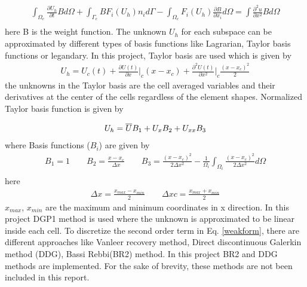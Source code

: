 \documentclass[12pt]{elsarticle}
\begin{document}
\begin{equation}\label{weakform}
\begin{gathered}
\int_{\Omega_e} \frac{\partial U_h}{\partial t} B d\Omega + \int_{\Gamma_e} B F_i(U_h) n_i d\Gamma - \int_{\Omega_e} F_i (U_h)\frac{\partial B}{\partial x_i}  d\Omega=\int \frac{\partial^2 u}{\partial x^2}B d \Omega\\
\end{gathered}
\end{equation}
here B is the weight function. The unknown $U_h$ for each subspace can be approximated by different types of basis functions like Lagrarian, Taylor basis functions or legandary. In this project, Taylor basis are used which is given by
\begin{equation}
\begin{gathered}
U_h=U_c(t)+\frac{\partial U(t)}{\partial x}\Big|_c (x-x_c)+\frac{\partial^2 U(t)}{\partial x^2}\Big|_c \frac{(x-x_c)^2}{2}
\end{gathered}
\end{equation}
the unknowns in the Taylor basis are the cell averaged variables and their derivatives at the center of the cells regardless of the element shapes. Normalized Taylor basis function is given by

\begin{equation}
U_h=\overline{U}B_1+U_x B_2+U_{xx} B_3\\
\end{equation}
where Basis functions ($B_i$) are given by
\begin{equation}
\begin{gathered}
B_1=1 \qquad B_2= \frac{x-x_c}{\Delta x} \qquad B_3=\frac{(x-x_c)^2}{2 \Delta x^2}-\frac{1}{\Omega_i} \int_{\Omega_i}\frac{(x-x_c)^2}{2 \Delta x^2} d \Omega\\
\end{gathered}
\end{equation}
here
\begin{equation}
\begin{gathered}
\Delta x= \frac{x_{max}-x_{min}}{2} \qquad \Delta xc= \frac{x_{max}+x_{min}}{2}
\end{gathered}
\end{equation}
$x_{max}$, $x_{min}$ are the maximum and minimum coordinates in x direction. In this project DGP1 method is used where the unknown is approximated to be linear inside each cell. To discretize the second order term in Eq. \ref{weakform}, there are different approaches like Vanleer recovery method, Direct discontinuous Galerkin method (DDG), Bassi Rebbi(BR2) method. In this project BR2 and DDG methods are implemented. For the sake of brevity, these methods are not been included in this report. 
\end{document}
